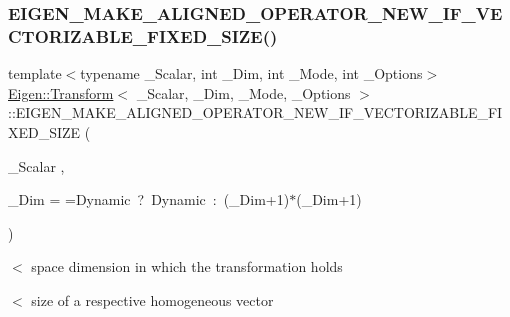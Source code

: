 \subsubsection{\texorpdfstring{EIGEN\_MAKE\_ALIGNED\_OPERATOR\_NEW\_IF\_VECTORIZABLE\_FIXED\_SIZE()}{EIGEN\_MAKE\_ALIGNED\_OPERATOR\_NEW\_IF\_VECTORIZABLE\_FIXED\_SIZE()}}
{\footnotesize\ttfamily template$<$typename \+\_\+\+Scalar, int \+\_\+\+Dim, int \+\_\+\+Mode, int \+\_\+\+Options$>$ \\
\mbox{\hyperlink{class_eigen_1_1_transform}{Eigen\+::\+Transform}}$<$ \+\_\+\+Scalar, \+\_\+\+Dim, \+\_\+\+Mode, \+\_\+\+Options $>$\+::E\+I\+G\+E\+N\+\_\+\+M\+A\+K\+E\+\_\+\+A\+L\+I\+G\+N\+E\+D\+\_\+\+O\+P\+E\+R\+A\+T\+O\+R\+\_\+\+N\+E\+W\+\_\+\+I\+F\+\_\+\+V\+E\+C\+T\+O\+R\+I\+Z\+A\+B\+L\+E\+\_\+\+F\+I\+X\+E\+D\+\_\+\+S\+I\+ZE (\begin{DoxyParamCaption}\item[{\+\_\+\+Scalar}]{,  }\item[{\+\_\+\+Dim}]{ = {\ttfamily =Dynamic~?~Dynamic~\+:~(\+\_\+Dim+1)$\ast$(\+\_\+Dim+1)} }\end{DoxyParamCaption})\hspace{0.3cm}{\ttfamily [inline]}}

$<$ space dimension in which the transformation holds

$<$ size of a respective homogeneous vector \mbox{\label{class_eigen_1_1_transform_a8eaa668cb09cd019ecb3ce5d3b75e5ce}} 
